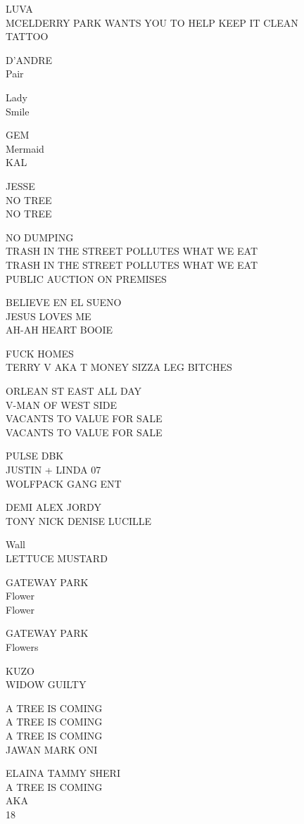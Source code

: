 \documentclass[10pt,letterpaper]{article}
\begin{document}
LUVA\\
MCELDERRY PARK WANTS YOU TO HELP KEEP IT CLEAN\\
TATTOO

D'ANDRE\\
Pair

Lady\\
Smile

GEM\\
Mermaid\\
KAL

JESSE\\
NO TREE\\
NO TREE

NO DUMPING\\
TRASH IN THE STREET POLLUTES WHAT WE EAT\\
TRASH IN THE STREET POLLUTES WHAT WE EAT\\
PUBLIC AUCTION ON PREMISES

BELIEVE EN EL SUENO\\
JESUS LOVES ME\\
AH{-}AH HEART BOOIE

FUCK HOMES\\
TERRY V AKA T MONEY SIZZA LEG BITCHES

ORLEAN ST EAST ALL DAY\\
V{-}MAN OF WEST SIDE\\
VACANTS TO VALUE FOR SALE\\
VACANTS TO VALUE FOR SALE

PULSE DBK\\
JUSTIN + LINDA 07\\
WOLFPACK GANG ENT

DEMI ALEX JORDY\\
TONY NICK DENISE LUCILLE

Wall\\
LETTUCE MUSTARD

GATEWAY PARK\\
Flower\\
Flower

GATEWAY PARK\\
Flowers

KUZO\\
WIDOW GUILTY

A TREE IS COMING\\
A TREE IS COMING\\
A TREE IS COMING\\
JAWAN MARK ONI

ELAINA TAMMY SHERI\\
A TREE IS COMING\\
AKA\\
18
\end{document}

